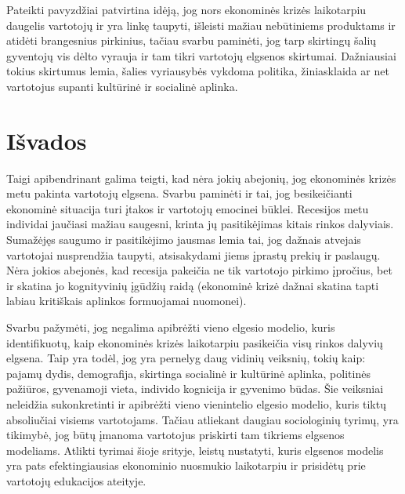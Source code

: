 \documentclass[l1pt, titlepage]{article}
\begin{document}
Pateikti pavyzdžiai patvirtina idėją, jog nors ekonominės krizės laikotarpiu daugelis vartotojų ir yra linkę taupyti, išleisti mažiau nebūtiniems produktams ir atidėti brangesnius pirkinius, tačiau svarbu paminėti, jog tarp skirtingų šalių gyventojų vis dėlto vyrauja ir tam tikri vartotojų elgsenos skirtumai. Dažniausiai tokius skirtumus lemia, šalies vyriausybės vykdoma politika, žiniasklaida ar net vartotojus supanti kultūrinė ir socialinė aplinka.  


\section{Išvados}

Taigi apibendrinant galima teigti, kad nėra jokių abejonių, jog ekonominės krizės metu pakinta vartotojų elgsena. Svarbu paminėti  ir tai, jog besikeičianti ekonominė situacija turi įtakos ir vartotojų emocinei būklei. Recesijos metu individai jaučiasi mažiau saugesni, krinta jų pasitikėjimas kitais rinkos dalyviais. Sumažėjęs saugumo ir pasitikėjimo jausmas lemia tai, jog dažnais atvejais vartotojai nusprendžia taupyti, atsisakydami jiems įprastų prekių ir paslaugų. Nėra jokios abejonės, kad recesija pakeičia ne tik vartotojo pirkimo įpročius, bet ir skatina jo kognityvinių įgūdžių raidą (ekonominė krizė dažnai skatina tapti labiau kritiškais aplinkos formuojamai nuomonei).

Svarbu pažymėti, jog negalima apibrėžti vieno elgesio modelio, kuris identifikuotų, kaip ekonominės krizės laikotarpiu pasikeičia visų rinkos dalyvių elgsena. Taip yra todėl, jog yra pernelyg daug vidinių veiksnių, tokių kaip: pajamų dydis, demografija, skirtinga socialinė ir kultūrinė aplinka, politinės pažiūros, gyvenamoji vieta, individo kognicija ir gyvenimo būdas. Šie veiksniai neleidžia sukonkretinti ir apibrėžti vieno vienintelio elgesio modelio, kuris tiktų absoliučiai visiems vartotojams. Tačiau atliekant daugiau sociologinių tyrimų, yra tikimybė, jog būtų įmanoma vartotojus priskirti tam tikriems elgsenos modeliams. Atlikti tyrimai šioje srityje, leistų nustatyti, kuris elgsenos modelis yra pats efektingiausias ekonominio nuosmukio laikotarpiu ir prisidėtų prie vartotojų edukacijos ateityje.
\end{document}

